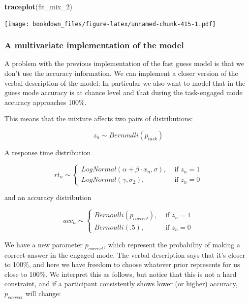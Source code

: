 \documentclass[12pt,]{krantz}
\newenvironment{Shaded}{\begin{snugshade}}{\end{snugshade}}
\newcommand{\KeywordTok}[1]{\textcolor[rgb]{0.13,0.29,0.53}{\textbf{#1}}}
\newcommand{\DecValTok}[1]{\textcolor[rgb]{0.00,0.00,0.81}{#1}}
\newcommand{\NormalTok}[1]{#1}
\theoremstyle{definition}
\theoremstyle{definition}
\theoremstyle{definition}
\theoremstyle{remark}
\begin{document}
\begin{Shaded}
\begin{Highlighting}[]
\KeywordTok{traceplot}\NormalTok{(fit_mix_}\DecValTok{2}\NormalTok{) }
\end{Highlighting}
\end{Shaded}

\texttt{[image: bookdown\_files/figure-latex/unnamed-chunk-415-1.pdf]}

\subsubsection{A multivariate implementation of the
model}\label{sec:multmix}

A problem with the previous implementation of the fast guess model is
that we don't use the accuracy information. We can implement a closer
version of the verbal description of the model: In particular we also
want to model that in the guess mode accuracy is at chance level and
that during the task-engaged mode accuracy approaches 100\%.

This means that the mixture affects two pairs of distributions:

\begin{equation}
z_n \sim Bernoulli(p_{task})
\end{equation}

A response time distribution

\begin{equation}
rt_n \sim 
\begin{cases}
LogNormal(\alpha + \beta \cdot x_n, \sigma), & \text{ if } z_n =1 \\
LogNormal(\gamma, \sigma_2), & \text{ if } z_n=0
\end{cases}
\label{eq:dismix2}
\end{equation}

and an accuracy distribution

\begin{equation}
acc_n \sim 
\begin{cases}
Bernoulli(p_{correct}), & \text{ if } z_n =1 \\
Bernoulli(.5), & \text{ if } z_n=0
\end{cases}
\label{eq:dismix3}
\end{equation}

We have a new parameter \(p_{correct}\), which represent the probability
of making a correct answer in the engaged mode. The verbal description
says that it's closer to 100\%, and here we have freedom to choose
whatever prior represents for us close to 100\%. We interpret this as
follows, but notice that this is not a hard constraint, and if a
participant consistently shows lower (or higher) accuracy,
\(p_{correct}\) will change:
\end{document}
